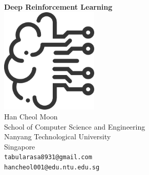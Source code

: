 \documentclass[oneside,a4paper,11pt]{book}
\begin{document}
\begin{titlepage}
	\begin{center}
		\vspace*{5.5cm}
		\textbf{\Huge Deep Reinforcement Learning}\\
        \vspace{2.5cm}
		\includegraphics[width=0.35\textwidth]{./images/logo/logo.pdf}\\
        \vspace{1.5cm}
        \vspace{1.5cm}
		Han Cheol Moon\\
		School of Computer Science and Engineering\\
		Nanyang Technological University\\
		Singapore\\
		\texttt{tabularasa8931@gmail.com}\\
		\texttt{hancheol001@edu.ntu.edu.sg}
		\date{\today}
	\end{center}
\end{titlepage}



\tableofcontents
\newpage

\mainmatter










\backmatter




\appendix

\end{document}
